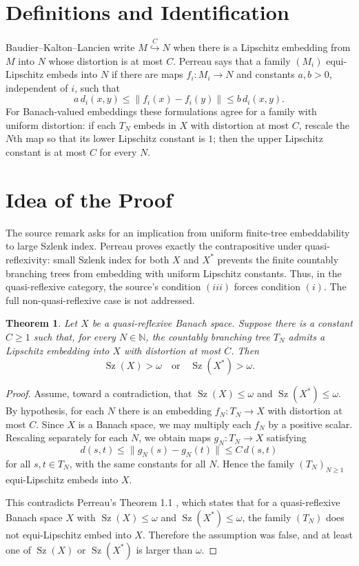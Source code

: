 \documentclass[11pt]{article}
\newtheorem{theorem}{Theorem}
\newcommand{\Sz}{\operatorname{Sz}}
\newcommand{\N}{\mathbb{N}}
\begin{document}
\section*{Definitions and Identification}

Baudier--Kalton--Lancien write $M\stackrel{C}{\hookrightarrow} N$ when there
is a Lipschitz embedding from $M$ into $N$ whose distortion is at most $C$.
Perreau says that a family $(M_i)$ equi-Lipschitz embeds into $N$ if there are
maps $f_i:M_i\to N$ and constants $a,b>0$, independent of $i$, such that
\[
  a\,d_i(x,y)\le \|f_i(x)-f_i(y)\|\le b\,d_i(x,y).
\]
For Banach-valued embeddings these formulations agree for a family with
uniform distortion: if each $T_N$ embeds in $X$ with distortion at most $C$,
rescale the $N$th map so that its lower Lipschitz constant is $1$; then the
upper Lipschitz constant is at most $C$ for every $N$.

\section*{Idea of the Proof}

The source remark asks for an implication from uniform finite-tree
embeddability to large Szlenk index. Perreau proves exactly the contrapositive
under quasi-reflexivity: small Szlenk index for both $X$ and $X^*$ prevents
the finite countably branching trees from embedding with uniform Lipschitz
constants. Thus, in the quasi-reflexive category, the source's condition
$(iii)$ forces condition $(i)$. The full non-quasi-reflexive case is not
addressed.

\begin{theorem}
Let $X$ be a quasi-reflexive Banach space. Suppose there is a constant
$C\ge 1$ such that, for every $N\in\N$, the countably branching tree $T_N$
admits a Lipschitz embedding into $X$ with distortion at most $C$. Then
\[
  \Sz(X)>\omega \quad\text{or}\quad \Sz(X^*)>\omega.
\]
\end{theorem}

\begin{proof}
Assume, toward a contradiction, that $\Sz(X)\le\omega$ and
$\Sz(X^*)\le\omega$. By hypothesis, for each $N$ there is an embedding
$f_N:T_N\to X$ with distortion at most $C$. Since $X$ is a Banach space, we may
multiply each $f_N$ by a positive scalar. Rescaling separately for each $N$,
we obtain maps $g_N:T_N\to X$ satisfying
\[
  d(s,t)\le \|g_N(s)-g_N(t)\|\le C\,d(s,t)
\]
for all $s,t\in T_N$, with the same constants for all $N$. Hence the family
$(T_N)_{N\ge 1}$ equi-Lipschitz embeds into $X$.

This contradicts Perreau's Theorem 1.1 \cite{Perreau2019}, which states that
for a quasi-reflexive Banach space $X$ with $\Sz(X)\le\omega$ and
$\Sz(X^*)\le\omega$, the family $(T_N)$ does not equi-Lipschitz embed into
$X$. Therefore the assumption was false, and at least one of $\Sz(X)$ or
$\Sz(X^*)$ is larger than $\omega$.
\end{proof}
\end{document}

